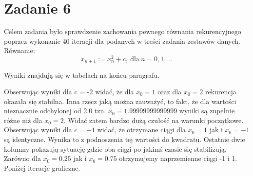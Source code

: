 \documentclass[]{article}
\begin{document}
	\section*{Zadanie 6}
	
	Celem zadania było sprawdzenie zachowania pewnego równania rekurencyjnego poprzez wykonanie 40 iteracji dla podanych w treści zadania zestawów danych. Równanie:
	$$x_{n+1} := x^2_n + c, \ \textrm{dla} \ n = 0,1,\dots$$
	
	Wyniki znajdują się w tabelach na końcu paragrafu.
	
	

	Obserwując wyniki dla c = -2 widać, że dla $x_0 = 1$ oraz dla $x_0 = 2$ rekurencja okazała się stabilna. Inna rzecz jaką można zauważyć, to fakt, że dla wartości nieznacznie odchylonej od 2.0 tzn. $x_0 = 1.99999999999999$ wyniki są zupełnie różne niż dla $x_0 = 2$. Widać zatem bardzo dużą czułość na warunki początkowe. Obserwując wyniki dla $c = -1$ widać, że otrzymane ciągi dla $x_0 = 1$ jak i $x_0 = -1$ są identyczne. Wynika to z podnoszenia tej wartości do kwadratu. Ostatnie dwie kolumny pokazują sytuację gdzie oba ciągi po jakimś czasie się stabilizują. Zarówno dla $x_0 = 0.25$ jak i $x_0 = 0.75$ otrzymujemy naprzemienne ciągi -1 i 1. Poniżej iteracje graficzne.
	
\end{document}
